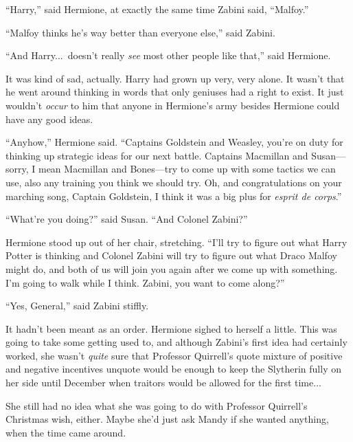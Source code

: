 “Harry,” said Hermione, at exactly the same time Zabini said, “Malfoy.”

“Malfoy thinks he’s way better than everyone else,” said Zabini.

“And Harry...\ doesn’t really \emph{see} most other people like that,” said Hermione.

It was kind of sad, actually. Harry had grown up very, very alone. It wasn’t that he went around thinking in words that only geniuses had a right to exist. It just wouldn’t \emph{occur} to him that anyone in Hermione’s army besides Hermione could have any good ideas.

“Anyhow,” Hermione said. “Captains Goldstein and Weasley, you’re on duty for thinking up strategic ideas for our next battle. Captains Macmillan and Susan—sorry, I mean Macmillan and Bones—try to come up with some tactics we can use, also any training you think we should try. Oh, and congratulations on your marching song, Captain Goldstein, I think it was a big plus for \emph{esprit de corps}.”

“What’re you doing?” said Susan. “And Colonel Zabini?”

Hermione stood up out of her chair, stretching. “I’ll try to figure out what Harry Potter is thinking and Colonel Zabini will try to figure out what Draco Malfoy might do, and both of us will join you again after we come up with something. I’m going to walk while I think. Zabini, you want to come along?”

“Yes, General,” said Zabini stiffly.

It hadn’t been meant as an order. Hermione sighed to herself a little. This was going to take some getting used to, and although Zabini’s first idea had certainly worked, she wasn’t \emph{quite} sure that Professor Quirrell’s quote mixture of positive and negative incentives unquote would be enough to keep the Slytherin fully on her side until December when traitors would be allowed for the first time...

She still had no idea what she was going to do with Professor Quirrell’s Christmas wish, either. Maybe she’d just ask Mandy if she wanted anything, when the time came around.


